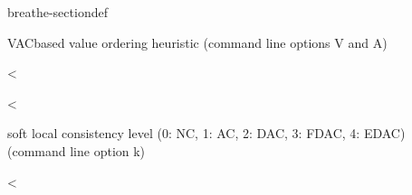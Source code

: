 \documentclass[letterpaper,10pt,openany,oneside,english]{sphinxmanual}
\begin{document}
\begin{fulllineitems}
\begin{sphinxuseclass}{breathe-sectiondef}
\begin{fulllineitems}
\sphinxAtStartPar
VAC\sphinxhyphen{}based value ordering heuristic (command line options \sphinxhyphen{}V and \sphinxhyphen{}A) 

\end{fulllineitems}


\begin{fulllineitems}
\label{\detokenize{ref/ref_cpp:_CPPv4N8ToulBar27LcLevelE}}\label{\detokenize{ref/ref_cpp:_CPPv3N8ToulBar27LcLevelE}}\label{\detokenize{ref/ref_cpp:_CPPv2N8ToulBar27LcLevelE}}\label{\detokenize{ref/ref_cpp:ToulBar2::LcLevel__LcLevelType}}
\pysigstartsignatures
\pysigstartmultiline
{}
\pysigstopmultiline
\pysigstopsignatures
\sphinxAtStartPar
\textless{} 

\end{fulllineitems}


\begin{fulllineitems}
\label{\detokenize{ref/ref_cpp:_CPPv4N8ToulBar210maxEACIterE}}\label{\detokenize{ref/ref_cpp:_CPPv3N8ToulBar210maxEACIterE}}\label{\detokenize{ref/ref_cpp:_CPPv2N8ToulBar210maxEACIterE}}\label{\detokenize{ref/ref_cpp:ToulBar2::maxEACIter__i}}
\pysigstartsignatures
\pysigstartmultiline
{}
\pysigstopmultiline
\pysigstopsignatures
\sphinxAtStartPar
\textless{} 

\sphinxAtStartPar
soft local consistency level (0: NC, 1: AC, 2: DAC, 3: FDAC, 4: EDAC) (command line option \sphinxhyphen{}k) 

\end{fulllineitems}


\begin{fulllineitems}
\label{\detokenize{ref/ref_cpp:_CPPv4N8ToulBar24wcnfE}}\label{\detokenize{ref/ref_cpp:_CPPv3N8ToulBar24wcnfE}}\label{\detokenize{ref/ref_cpp:_CPPv2N8ToulBar24wcnfE}}\label{\detokenize{ref/ref_cpp:ToulBar2::wcnf__b}}
\pysigstartsignatures
\pysigstartmultiline
{}
\pysigstopmultiline
\pysigstopsignatures
\sphinxAtStartPar
\textless{} 


\end{fulllineitems}
\end{sphinxuseclass}
\end{fulllineitems}
\end{document}
